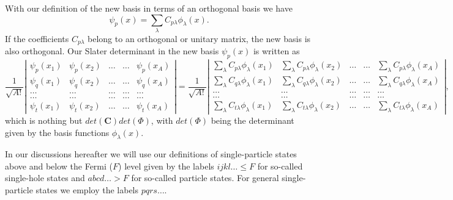 With our definition of the new basis in terms of an orthogonal basis we have
\[
\psi_p(x)  = \sum_{\lambda} C_{p\lambda}\phi_{\lambda}(x).
\]
If the coefficients $C_{p\lambda}$ belong to an orthogonal or unitary matrix, the new basis
is also orthogonal. 
Our Slater determinant in the new basis $\psi_p(x)$ is written as
\[
\frac{1}{\sqrt{A!}}
\left| \begin{array}{ccccc} \psi_{p}(x_1)& \psi_{p}(x_2)& \dots & \dots & \psi_{p}(x_A)\\
                            \psi_{q}(x_1)&\psi_{q}(x_2)& \dots & \dots & \psi_{q}(x_A)\\  
                            \dots & \dots & \dots & \dots & \dots \\
                            \dots & \dots & \dots & \dots & \dots \\
                     \psi_{t}(x_1)&\psi_{t}(x_2)& \dots & \dots & \psi_{t}(x_A)\end{array} \right|=\frac{1}{\sqrt{A!}}
\left| \begin{array}{ccccc} \sum_{\lambda} C_{p\lambda}\phi_{\lambda}(x_1)& \sum_{\lambda} C_{p\lambda}\phi_{\lambda}(x_2)& \dots & \dots & \sum_{\lambda} C_{p\lambda}\phi_{\lambda}(x_A)\\
                            \sum_{\lambda} C_{q\lambda}\phi_{\lambda}(x_1)&\sum_{\lambda} C_{q\lambda}\phi_{\lambda}(x_2)& \dots & \dots & \sum_{\lambda} C_{q\lambda}\phi_{\lambda}(x_A)\\  
                            \dots & \dots & \dots & \dots & \dots \\
                            \dots & \dots & \dots & \dots & \dots \\
                     \sum_{\lambda} C_{t\lambda}\phi_{\lambda}(x_1)&\sum_{\lambda} C_{t\lambda}\phi_{\lambda}(x_2)& \dots & \dots & \sum_{\lambda} C_{t\lambda}\phi_{\lambda}(x_A)\end{array} \right|,
\]
which is nothing but $det(\mathbf{C})det(\Phi)$, with $det(\Phi)$ being the determinant given by the basis functions $\phi_{\lambda}(x)$. 

In our discussions hereafter we will use our definitions of single-particle states above and below the Fermi ($F$) level given by the labels
$ijkl\dots \le F$ for so-called single-hole states and $abcd\dots > F$ for so-called particle states.
For general single-particle states we employ the labels $pqrs\dots$. 

